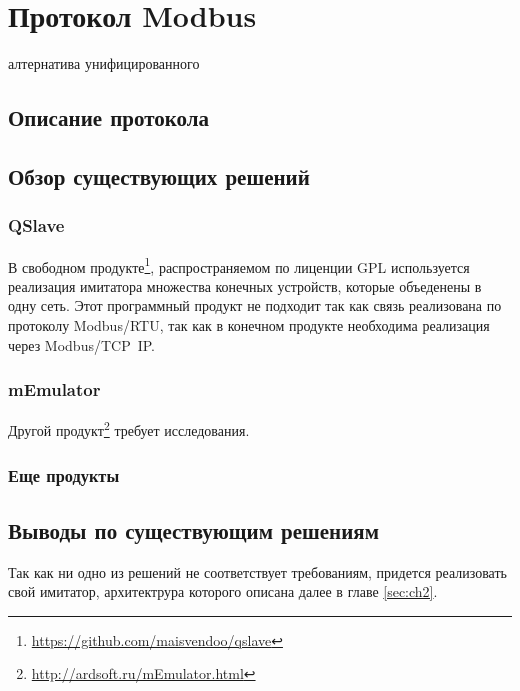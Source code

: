 
\chapter{Протокол Modbus}\label{ch:ch2}

алтернатива унифицированного 

\section{Описание протокола}

\section{Обзор существующих решений}\label{sec:ch2/sec1}
\subsection{QSlave}

В свободном продукте\footnote{\url{https://github.com/maisvendoo/qslave}}, распространяемом по лиценции GPL используется
реализация имитатора множества конечных устройств, которые объеденены в одну сеть.
Этот программный продукт не подходит так как связь реализована по протоколу
Modbus/RTU, так как в конечном продукте необходима реализация через Modbus/TCP~IP.

\subsection{mEmulator}
Другой продукт\footnote{\url{http://ardsoft.ru/mEmulator.html}} требует исследования.


\subsection{Еще продукты}


\section{Выводы по существующим решениям}

Так как ни одно из решений не соответствует требованиям, придется реализовать свой
имитатор, архитектрура которого описана далее в главе \ref{sec:ch2}.
